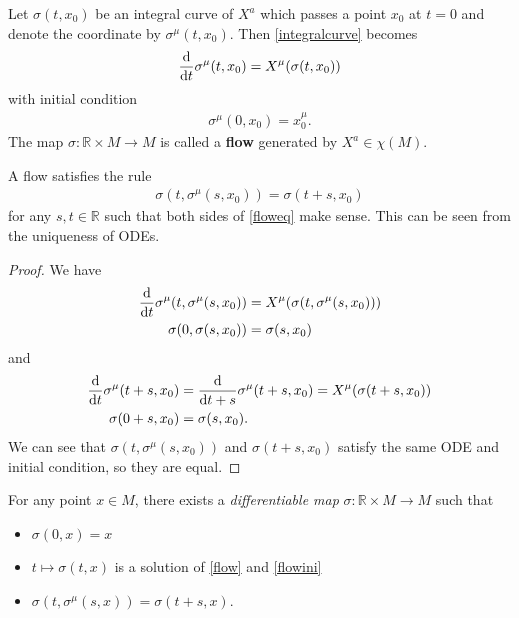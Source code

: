 \documentclass[10pt]{article}
\begin{document}
\begin{definition}[Flow]
    Let $\sigma(t,x_0)$ be an integral curve of $X^a$ which passes a point $x_0$ at $t=0$ and denote the coordinate by $\sigma^\mu(t,x_0)$.
    Then \cref{integralcurve} becomes
    \begin{align}\label{flow}
        \dv{t}\sigma^{\mu}(t,x_0)=X^\mu(\sigma(t,x_0))
    \end{align}
    with initial condition
    \begin{align}\label{flowini}
        \sigma^\mu(0,x_0)=x_0^\mu.
    \end{align}
    The map $\sigma:\mathbb{R}\times M\to M$ is called a \textbf{flow} generated by $X^a\in\chi(M)$.
\end{definition}
\begin{property}
    A flow satisfies the rule
    \begin{align}\label{floweq}
        \sigma(t,\sigma^\mu(s,x_0))=\sigma(t+s,x_0)
    \end{align}
    for any $s,t\in\mathbb{R}$ such that both sides of \cref{floweq} make sense.
    This can be seen from the uniqueness of ODEs.
\end{property}
\begin{proof}
    We have
    \begin{align}
        \dv{t}\sigma^\mu(t,\sigma^\mu(s,x_0)) & =X^\mu(\sigma(t,\sigma^\mu(s,x_0))) \\
        \sigma(0,\sigma(s,x_0))               & =\sigma(s,x_0)
    \end{align}
    and
    \begin{align}
        \dv{t}\sigma^\mu(t+s,x_0) & =\dv{t+s}\sigma^\mu(t+s,x_0)=X^\mu(\sigma(t+s,x_0)) \\
        \sigma(0+s,x_0)           & =\sigma(s,x_0).
    \end{align}
    We can see that $\sigma(t,\sigma^\mu(s,x_0))$ and $\sigma(t+s,x_0)$ satisfy the same ODE and initial condition, so they are equal.
\end{proof}
\begin{theorem}
    For any point $x\in M$, there exists a \textit{differentiable map} $\sigma:\mathbb{R}\times M\to M$ such that
    \begin{itemize}
        \item $\sigma(0,x)=x$
        \item $t\mapsto\sigma(t,x)$ is a solution of \cref{flow} and \cref{flowini}
        \item $\sigma(t,\sigma^\mu(s,x))=\sigma(t+s,x)$.
    \end{itemize}
\end{theorem}
\end{document}

